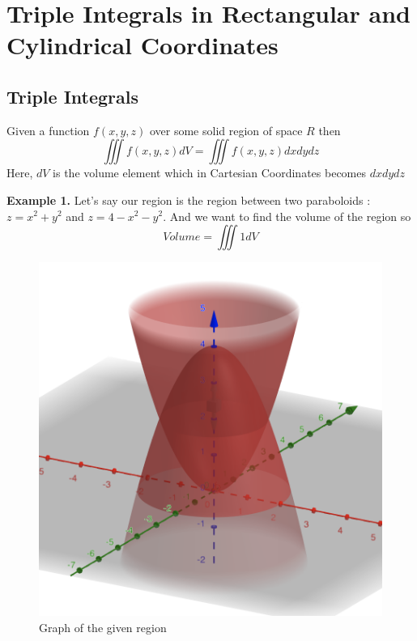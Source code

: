 

\chapter{Triple Integrals in Rectangular and Cylindrical Coordinates}

\bigbreak

\section{Triple Integrals}

Given a function $f(x, y, z)$ over some solid region of space $R$
then 
$$
\iiint f(x, y, z) dV = \iiint f(x, y, z) dx dy dz
$$
Here, $dV$ is the volume element which in Cartesian Coordinates becomes $dx dy dz$

{\bf Example 1. } Let's say our region is the region between two paraboloids : $z = x^2 + y^2$ and $z = 4 - x^2 - y^2$.
And we want to find the volume of the region so $$ Volume = \iiint 1 dV $$

\begin{figure}[ht!]
    \centering
    \includegraphics[scale=0.3]{./images/lecture_21_figure_1.png}
    \caption{Graph of the given region}
\end{figure}

